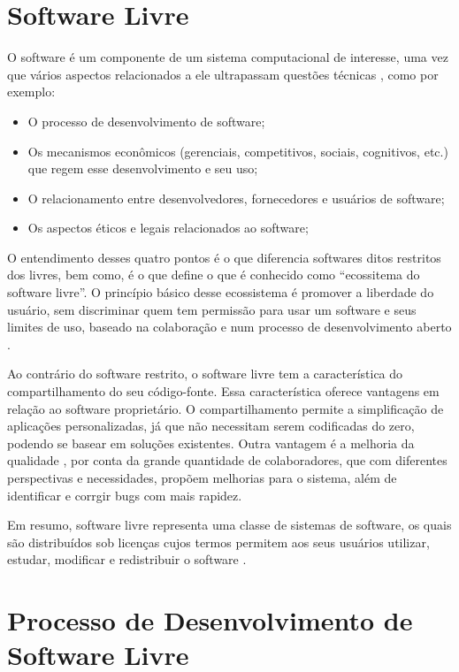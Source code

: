\section{Software Livre}

O software é um componente de um sistema computacional de interesse, uma vez que vários aspectos relacionados a ele ultrapassam questões técnicas \cite{meirelles2013metrics}, como por exemplo: 

\begin{itemize}
\item O processo de desenvolvimento de software;
\item Os mecanismos econômicos (gerenciais, competitivos, sociais, cognitivos, etc.) que regem esse desenvolvimento e seu uso;
\item O relacionamento entre desenvolvedores, fornecedores e usuários de software;
\item Os aspectos éticos e legais relacionados ao software;
\end{itemize}

O entendimento desses quatro pontos é o que diferencia softwares ditos restritos dos livres, bem como, é o que define o que é conhecido como ``ecossitema do software livre''. O princípio básico desse ecossistema é promover a liberdade do usuário, sem discriminar quem tem permissão para usar um software e seus limites de uso, baseado na colaboração e num processo de desenvolvimento aberto \cite{meirelles2013metrics}.

Ao contrário do software restrito, o software livre tem a característica do compartilhamento do seu código-fonte. Essa característica oferece vantagens em relação ao software proprietário. O compartilhamento permite a simplificação de aplicações personalizadas, já que não necessitam serem codificadas do zero, podendo se basear em soluções existentes. Outra vantagem é a melhoria da qualidade \cite{Raymond, 1999}, por conta da grande quantidade de colaboradores, que com diferentes perspectivas e necessidades, propõem melhorias para o sistema, além de identificar e corrgir bugs com mais rapidez.

Em resumo, software livre representa uma classe de sistemas de software, os quais são distribuídos sob licenças cujos termos permitem aos seus usuários utilizar, estudar, modificar e redistribuir o software \cite{terceiro2012freesoftware}. 

\section{Processo de Desenvolvimento de Software Livre}
\label{sec-proc-sl}


